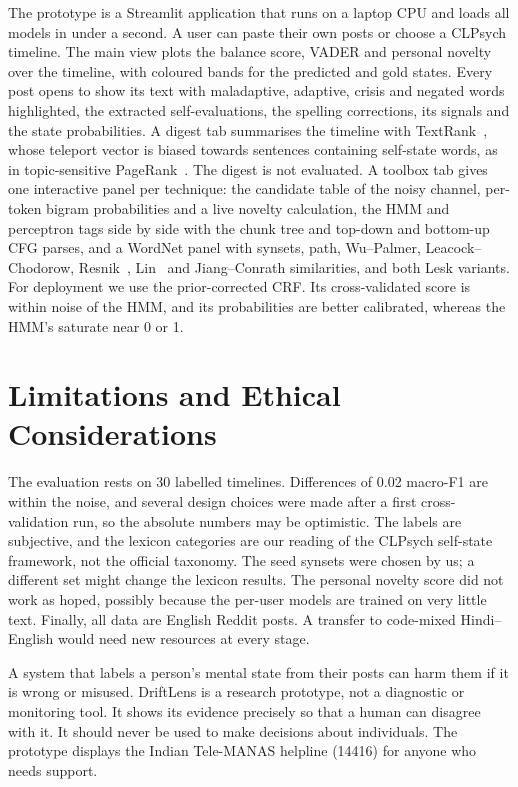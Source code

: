 \documentclass[runningheads]{llncs}
\begin{document}
The prototype is a Streamlit application that runs on a laptop CPU and loads all models in under a second. A user can paste their own posts or choose a CLPsych timeline. The main view plots the balance score, VADER and personal novelty over the timeline, with coloured bands for the predicted and gold states. Every post opens to show its text with maladaptive, adaptive, crisis and negated words highlighted, the extracted self-evaluations, the spelling corrections, its signals and the state probabilities. A digest tab summarises the timeline with TextRank~\cite{mihalcea2004textrank}, whose teleport vector is biased towards sentences containing self-state words, as in topic-sensitive PageRank~\cite{haveliwala2002topic}. The digest is not evaluated. A toolbox tab gives one interactive panel per technique: the candidate table of the noisy channel, per-token bigram probabilities and a live novelty calculation, the HMM and perceptron tags side by side with the chunk tree and top-down and bottom-up CFG parses, and a WordNet panel with synsets, path, Wu--Palmer, Leacock--Chodorow, Resnik~\cite{resnik1995using}, Lin~\cite{lin1998information} and Jiang--Conrath similarities, and both Lesk variants. For deployment we use the prior-corrected CRF. Its cross-validated score is within noise of the HMM, and its probabilities are better calibrated, whereas the HMM's saturate near 0 or 1.

\section{Limitations and Ethical Considerations}

The evaluation rests on 30 labelled timelines. Differences of 0.02 macro-F1 are within the noise, and several design choices were made after a first cross-validation run, so the absolute numbers may be optimistic. The labels are subjective, and the lexicon categories are our reading of the CLPsych self-state framework, not the official taxonomy. The seed synsets were chosen by us; a different set might change the lexicon results. The personal novelty score did not work as hoped, possibly because the per-user models are trained on very little text. Finally, all data are English Reddit posts. A transfer to code-mixed Hindi--English would need new resources at every stage.

A system that labels a person's mental state from their posts can harm them if it is wrong or misused. DriftLens is a research prototype, not a diagnostic or monitoring tool. It shows its evidence precisely so that a human can disagree with it. It should never be used to make decisions about individuals. The prototype displays the Indian Tele-MANAS helpline (14416) for anyone who needs support.
\end{document}
